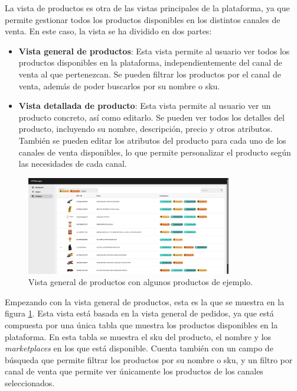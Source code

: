 La vista de productos es otra de las vistas principales de la plataforma, ya que permite gestionar todos los productos disponibles en los distintos canales de venta. En este caso, la vista se ha dividido en dos partes:
\begin{itemize}
    \item \textbf{Vista general de productos}: Esta vista permite al usuario ver todos los productos disponibles en la plataforma, independientemente del canal de venta al que pertenezcan. Se pueden filtrar los productos por el canal de venta, además de poder buscarlos por su nombre o \gls{sku}.
    \item \textbf{Vista detallada de producto}: Esta vista permite al usuario ver un producto concreto, así como editarlo. Se pueden ver todos los detalles del producto, incluyendo su nombre, descripción, precio y otros atributos. También se pueden editar los atributos del producto para cada uno de los canales de venta disponibles, lo que permite personalizar el producto según las necesidades de cada canal.
\end{itemize}

\begin{figure}[H]
    \centering
    \includegraphics[width=0.8\textwidth]{figures/design_develop/screenshots/tabla_productos.png}
    \caption{Vista general de productos con algunos productos de ejemplo.}
    \label{fig:dev:ss:vista_general_productos}
\end{figure}

Empezando con la vista general de productos, esta es la que se muestra en la figura \ref{fig:dev:ss:vista_general_productos}. Esta vista está basada en la vista general de pedidos, ya que está compuesta por una única tabla que muestra los productos disponibles en la plataforma. En esta tabla se muestra el \gls{sku} del producto, el nombre y los \textit{marketplaces} en los que está disponible. Cuenta también con un campo de búsqueda que permite filtrar los productos por su nombre o \gls{sku}, y un filtro por canal de venta que permite ver únicamente los productos de los canales seleccionados.

